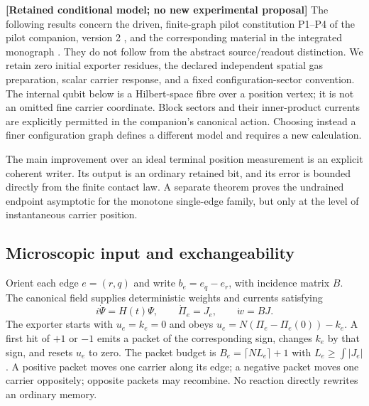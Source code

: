 \documentclass[11pt,a4paper]{article}
\theoremstyle{definition}
\theoremstyle{remark}\newtheorem{remark}[theorem]{Remark}
\newcommand{\status}[1]{\textbf{[#1]}\quad}
\begin{document}
\status{Retained conditional model; no new experimental proposal}
The following results concern the driven, finite-graph pilot constitution P1--P4 of the pilot companion, version 2 \cite{Pilot}, and the corresponding material in the integrated monograph \cite{RM}. They do not follow from the abstract source/readout distinction. We retain zero initial exporter residues, the declared independent spatial gas preparation, scalar carrier response, and a fixed configuration-sector convention. The internal qubit below is a Hilbert-space fibre over a position vertex; it is not an omitted fine carrier coordinate. Block sectors and their inner-product currents are explicitly permitted in the companion's canonical action. Choosing instead a finer configuration graph defines a different model and requires a new calculation.

The main improvement over an ideal terminal position measurement is an explicit coherent writer. Its output is an ordinary retained bit, and its error is bounded directly from the finite contact law. A separate theorem proves the undrained endpoint asymptotic for the monotone single-edge family, but only at the level of instantaneous carrier position.

\subsection{Microscopic input and exchangeability}

Orient each edge $e=(r,q)$ and write $b_e=e_q-e_r$, with incidence matrix $B$. The canonical field supplies deterministic weights and currents satisfying
\begin{equation}\label{pil:ownership}
 i\dot\Psi=H(t)\Psi,\qquad \dot\Pi_e=J_e,\qquad \dot w=BJ.
\end{equation}
The exporter starts with $u_e=k_e=0$ and obeys $u_e=N(\Pi_e-\Pi_e(0))-k_e$. A first hit of $+1$ or $-1$ emits a packet of the corresponding sign, changes $k_e$ by that sign, and resets $u_e$ to zero. The packet budget is $B_e=\lceil NL_e\rceil+1$ with $L_e\ge\int |J_e|$. A positive packet moves one carrier along its edge; a negative packet moves one carrier oppositely; opposite packets may recombine. No reaction directly rewrites an ordinary memory.
\end{document}
